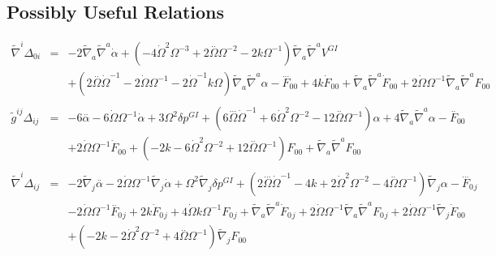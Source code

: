 \documentclass[10pt,letterpaper]{article}
\numberwithin{equation}{section}
\begin{document}
\begin{appendices}
\section{Possibly Useful Relations}
\begin{eqnarray}
\tilde\nabla^i\Delta_{0i}&=& -2 \tilde{\nabla}_{a}\tilde{\nabla}^{a}\dot{\alpha} + (-4 \dot{\Omega}^2 \Omega^{-3} + 2 \overset{..}{\Omega} \Omega^{-2} - 2 k \Omega^{-1}) \tilde{\nabla}_{a}\tilde{\nabla}^{a}V^{GI}{} \nonumber \\ 
&& + (2 \overset{..}{\Omega} \dot{\Omega}^{-1} - 2 \dot{\Omega} \Omega^{-1} - 2 \dot{\Omega}^{-1} k \Omega) \tilde{\nabla}_{a}\tilde{\nabla}^{a}\alpha - \overset{...}{F}_{00}{} + 4 k \dot{F}_{00}{} + \tilde{\nabla}_{a}\tilde{\nabla}^{a}\dot{F}_{00}{} + 2 \dot{\Omega} \Omega^{-1} \tilde{\nabla}_{a}\tilde{\nabla}^{a}F_{00}{}
\\  \nonumber\\ 
\tilde g^{ij}\Delta_{ij}&=& -6 \overset{..}{\alpha} - 6 \dot{\Omega} \Omega^{-1} \dot{\alpha} + 3 \Omega^2 \delta p^{GI}{} + (6 \overset{...}{\Omega} \dot{\Omega}^{-1} + 6 \dot{\Omega}^2 \Omega^{-2} - 12 \overset{..}{\Omega} \Omega^{-1}) \alpha + 4 \tilde{\nabla}_{a}\tilde{\nabla}^{a}\alpha - \overset{..}{F}_{00}{} \nonumber \\ 
&& + 2 \dot{\Omega} \Omega^{-1} \dot{F}_{00}{} + (-2 k - 6 \dot{\Omega}^2 \Omega^{-2} + 12 \overset{..}{\Omega} \Omega^{-1}) F_{00}{} + \tilde{\nabla}_{a}\tilde{\nabla}^{a}F_{00}{}
\\  \nonumber\\ 
\tilde\nabla^i\Delta_{ij}&=& -2 \tilde{\nabla}_{j}\overset{..}{\alpha} - 2 \dot{\Omega} \Omega^{-1} \tilde{\nabla}_{j}\dot{\alpha} + \Omega^2 \tilde{\nabla}_{j}\delta p^{GI}{} + (2 \overset{...}{\Omega} \dot{\Omega}^{-1} - 4 k + 2 \dot{\Omega}^2 \Omega^{-2} - 4 \overset{..}{\Omega} \Omega^{-1}) \tilde{\nabla}_{j}\alpha - \overset{...}{F}_{0}{}_{j} \nonumber \\ 
&& - 2 \dot{\Omega} \Omega^{-1} \overset{..}{F}_{0}{}_{j} + 2 k \dot{F}_{0}{}_{j} + 4 \dot{\Omega} k \Omega^{-1} F_{0}{}_{j} + \tilde{\nabla}_{a}\tilde{\nabla}^{a}\dot{F}_{0}{}_{j} + 2 \dot{\Omega} \Omega^{-1} \tilde{\nabla}_{a}\tilde{\nabla}^{a}F_{0}{}_{j} + 2 \dot{\Omega} \Omega^{-1} \tilde{\nabla}_{j}\dot{F}_{00}{} \nonumber \\ 
&& + (-2 k - 2 \dot{\Omega}^2 \Omega^{-2} + 4 \overset{..}{\Omega} \Omega^{-1}) \tilde{\nabla}_{j}F_{00}{}

\end{eqnarray}
\end{appendices}
\end{document}
